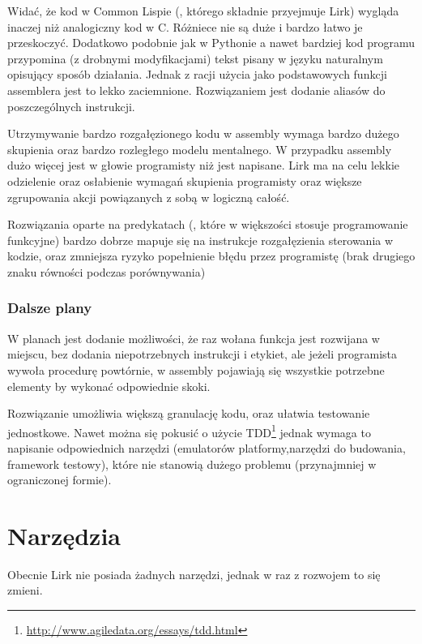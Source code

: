 \documentclass[11pt]{article}
\begin{document}
\begin{multicols}{3}

\columnbreak

\columnbreak

\end{multicols}

Widać, że kod w Common Lispie (, którego składnie przyejmuje Lirk) wygląda inaczej niż analogiczny kod w C. Różniece nie są duże i bardzo łatwo je przeskoczyć. Dodatkowo podobnie jak w Pythonie a nawet bardziej kod programu przypomina (z drobnymi modyfikacjami) tekst pisany w języku naturalnym opisujący sposób działania. Jednak z racji użycia jako podstawowych funkcji assemblera jest to lekko zaciemnione. Rozwiązaniem jest dodanie aliasów do poszczególnych instrukcji. 

Utrzymywanie bardzo rozgałęzionego kodu w assembly wymaga bardzo dużego skupienia oraz bardzo rozległego modelu mentalnego. W przypadku assembly dużo więcej jest w głowie programisty niż jest napisane.
Lirk ma na celu lekkie odzielenie oraz osłabienie wymagań skupienia programisty oraz większe zgrupowania akcji powiązanych z sobą w logiczną całość.

Rozwiązania oparte na predykatach (, które w większości stosuje programowanie funkcyjne) bardzo dobrze mapuje się na instrukcje rozgałęzienia sterowania w kodzie,
oraz zmniejsza ryzyko popełnienie błędu przez programistę (brak drugiego znaku równości podczas porównywania)

\subsubsection{Dalsze plany}

W planach jest dodanie możliwości, że raz wołana funkcja jest rozwijana w miejscu, bez dodania niepotrzebnych instrukcji i etykiet, ale jeżeli programista wywoła procedurę powtórnie, w assembly pojawiają się wszystkie potrzebne elementy by wykonać odpowiednie skoki.

Rozwiązanie umożliwia większą granulację kodu, oraz ułatwia testowanie jednostkowe. Nawet można się pokusić o użycie TDD\footnote{\url{http://www.agiledata.org/essays/tdd.html}} jednak wymaga to napisanie odpowiednich narzędzi (emulatorów platformy,narzędzi do budowania, framework testowy), które nie stanowią dużego problemu (przynajmniej w ograniczonej formie).


\section{Narzędzia}
Obecnie Lirk nie posiada żadnych narzędzi, jednak w raz z rozwojem to się zmieni.
\end{document}
